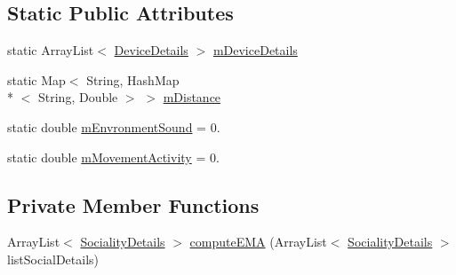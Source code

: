 \subsection*{Static Public Attributes}
\begin{DoxyCompactItemize}
\item 
static Array\-List$<$ \hyperlink{classcs_1_1nsense_1_1inference_module_1_1_social_interaction_1_1_device_details}{Device\-Details} $>$ \hyperlink{classcs_1_1nsense_1_1inference_module_1_1_social_interaction_ab82b4e9c6391569e21909ba53a99a402}{m\-Device\-Details}
\item 
static Map$<$ String, Hash\-Map\\*
$<$ String, Double $>$ $>$ \hyperlink{classcs_1_1nsense_1_1inference_module_1_1_social_interaction_a9fa08ba745e09be222794b6699ef5e9c}{m\-Distance}
\item 
static double \hyperlink{classcs_1_1nsense_1_1inference_module_1_1_social_interaction_a63536bd91de705c47a2ff24deff84f36}{m\-Envronment\-Sound} = 0.
\item 
static double \hyperlink{classcs_1_1nsense_1_1inference_module_1_1_social_interaction_a82ce9d45646e36547602fb66bb866f27}{m\-Movement\-Activity} = 0.
\end{DoxyCompactItemize}
\subsection*{Private Member Functions}
\begin{DoxyCompactItemize}
\item 
Array\-List$<$ \hyperlink{classcs_1_1nsense_1_1inference_module_1_1_sociality_details}{Sociality\-Details} $>$ \hyperlink{classcs_1_1nsense_1_1inference_module_1_1_social_interaction_a4558b9c70dc411ff302d25ff1cdae4e5}{compute\-E\-M\-A} (Array\-List$<$ \hyperlink{classcs_1_1nsense_1_1inference_module_1_1_sociality_details}{Sociality\-Details} $>$ list\-Social\-Details)
\end{DoxyCompactItemize}
